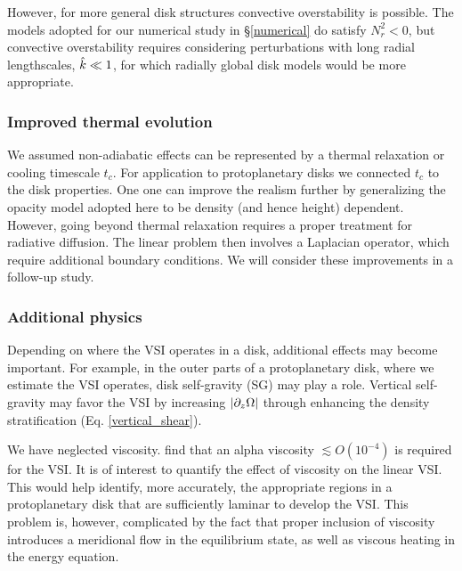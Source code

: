 However, for more general disk structures convective overstability is
possible. The models adopted for our numerical study in
\S\ref{numerical} do satisfy $N_r^2<0$, but convective overstability
requires considering perturbations with long radial lengthscales,
$\hat{k}\ll 1$, for which radially global disk models would be more 
appropriate.  

\subsubsection{Improved thermal evolution} 
We assumed non-adiabatic effects
can be represented by a thermal relaxation or cooling timescale $t_c$. For 
application to protoplanetary disks we connected $t_c$ to the disk
properties. One one can improve the realism further by generalizing the 
opacity model adopted here to be density (and hence height) dependent. 
However, going beyond thermal relaxation requires a
proper treatment for radiative diffusion. The linear problem then
involves a Laplacian operator, which require additional boundary
conditions. We will consider these improvements in a
follow-up study. %
 
\subsubsection{Additional physics} 
Depending on where the VSI operates in a
disk, additional effects may become important. For example, in the
outer parts of a protoplanetary disk, where we estimate the VSI 
operates, disk self-gravity (SG) may play a role. Vertical
self-gravity may favor the VSI by increasing $|\partial_z\Omega|$ through
enhancing the density stratification 
(Eq. \ref{vertical_shear}). %

We have neglected viscosity. \cite{nelson13} find that an 
alpha viscosity $\lesssim O(10^{-4})$ is required for the VSI. 
It is of interest to quantify the effect of viscosity 
on the linear VSI. This would help identify, more accurately, the
appropriate regions in a protoplanetary disk that are sufficiently
laminar to develop the VSI.  This problem is, however, complicated by
the fact that proper inclusion of viscosity introduces a meridional
flow in the equilibrium state, as well as viscous heating
in the energy equation. 


